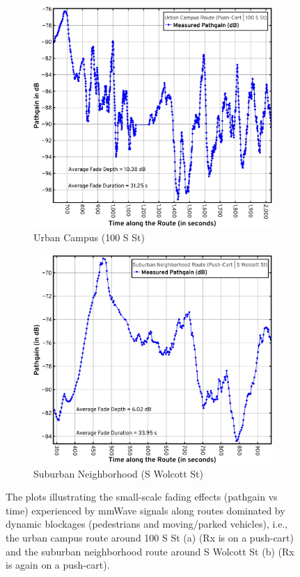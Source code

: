 \documentclass[12pt, draftcls, onecolumn]{IEEEtran}
\begin{document}
{\begin{figure} [t]
\begin{subfigure}{0.482\linewidth}
         \includegraphics[width=1.0\linewidth]{figs/urban_campus_pathgain_vs_time.pdf}
         \caption{Urban Campus (100 S St)}
         \label{F10a}
     \end{subfigure}
     \begin{subfigure}{0.508\linewidth}
         \centering
         \includegraphics[width=1.0\linewidth]{figs/suburban_pathgain_vs_time.pdf}
         \caption{Suburban Neighborhood (S Wolcott St)}
         \label{F10b}
     \end{subfigure}
     \vspace{-8mm}
     \caption{The plots illustrating the small-scale fading effects (pathgain vs time) experienced by mmWave signals along routes dominated by dynamic blockages (pedestrians and moving/parked vehicles), i.e., the urban campus route around 100 S St (a) (Rx is on a push-cart) and the suburban neighborhood route around S Wolcott St (b) (Rx is again on a push-cart).}
     \label{F10}
\end{figure}
\vspace{-3mm}

}
\end{document}
